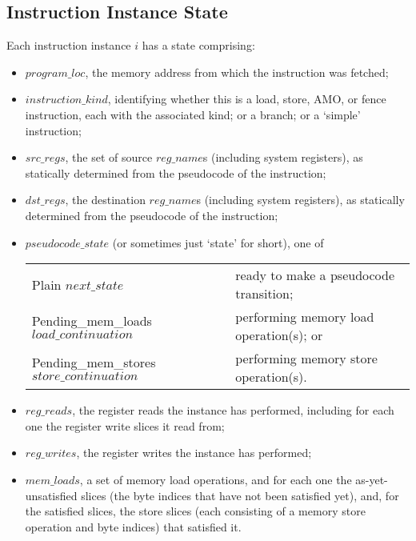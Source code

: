 \subsection{Instruction Instance State}\label{sec:omm:inst_state}
Each instruction instance $i$ has a state comprising:
\begin{itemize}
\item $program\_loc$, the memory address from which the instruction was fetched;
\item $instruction\_kind$, identifying whether this is a load, store, AMO, or fence instruction, each with the associated kind; or a branch; or a `simple' instruction;
\item $src\_regs$, the set of source $reg\_name$s (including system registers), as statically determined from the pseudocode of the instruction;
\item $dst\_regs$, the destination $reg\_name$s (including system registers), as statically determined from the pseudocode of the instruction;
\item $pseudocode\_state$ (or sometimes just `state' for short), one of
  \begin{center}
  \begin{tabular}{l@{ - }l}
  {\sc Plain} $next\_state$                        & ready to make a pseudocode transition; \\
  {\sc Pending\_mem\_loads} $load\_continuation$   & performing memory load operation(s); or \\
  {\sc Pending\_mem\_stores} $store\_continuation$ & performing memory store operation(s). \\
  \end{tabular}
  \end{center}
\item $reg\_reads$, the register reads the instance has performed, including for each one the register write slices it read from;
\item $reg\_writes$, the register writes the instance has performed;
\item $mem\_loads$, a set of memory load operations, and for each one the as-yet-unsatisfied slices (the byte indices that have not been satisfied yet), and, for the satisfied slices, the store slices (each consisting of a memory store operation and byte indices) that satisfied it.

\end{itemize}
